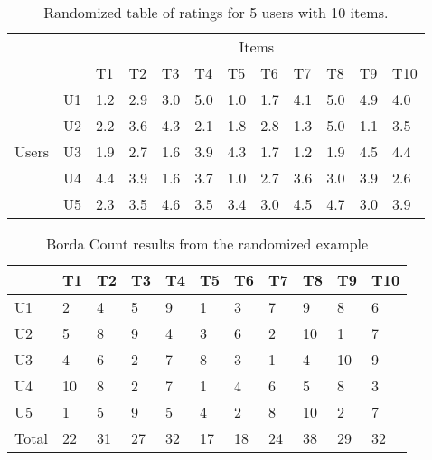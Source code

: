\begin{table}[H]
	\centering
	\begin{tabular}{cl|l|l|l|l|l|l|l|l|l|l|}
		\cline{3-12}
		\multicolumn{1}{l}{}                         &    & \multicolumn{10}{c|}{Items}                               \\ \cline{3-12} 
		\multicolumn{1}{l}{}                         &    & T1  & T2  & T3  & T4  & T5  & T6  & T7  & T8  & T9  & T10 \\ \hline
		\multicolumn{1}{|c|}{\multirow{5}{*}{Users}} & U1 & 1.2 & 2.9 & 3.0 & 5.0 & 1.0 & 1.7 & 4.1 & 5.0 & 4.9 & 4.0 \\ \cline{2-12} 
		\multicolumn{1}{|c|}{}                       & U2 & 2.2 & 3.6 & 4.3 & 2.1 & 1.8 & 2.8 & 1.3 & 5.0 & 1.1 & 3.5 \\ \cline{2-12} 
		\multicolumn{1}{|c|}{}                       & U3 & 1.9 & 2.7 & 1.6 & 3.9 & 4.3 & 1.7 & 1.2 & 1.9 & 4.5 & 4.4 \\ \cline{2-12} 
		\multicolumn{1}{|c|}{}                       & U4 & 4.4 & 3.9 & 1.6 & 3.7 & 1.0 & 2.7 & 3.6 & 3.0 & 3.9 & 2.6 \\ \cline{2-12} 
		\multicolumn{1}{|c|}{}                       & U5 & 2.3 & 3.5 & 4.6 & 3.5 & 3.4 & 3.0 & 4.5 & 4.7 & 3.0 & 3.9 \\ \hline
	\end{tabular}
	\caption{Randomized table of ratings for 5 users with 10 items.}
	\label{tbl:randomratingstable}
\end{table}


\begin{table}[H]
	\centering
	\begin{tabular}{l|l|l|l|l|l|l|l|l|l|l|}
		\cline{2-11}
		& T1 & T2 & T3 & T4 & T5 & T6 & T7 & T8 & T9 & T10 \\ \hline
		\multicolumn{1}{|l|}{U1} & 2 & 4 & 5 & 9 & 1 & 3 & 7 & 9 & 8 & 6 \\ \hline
		\multicolumn{1}{|l|}{U2} & 5 & 8 & 9 & 4 & 3 & 6 & 2 & 10 & 1 & 7 \\ \hline
		\multicolumn{1}{|l|}{U3} & 4 & 6 & 2 & 7 & 8 & 3 & 1 & 4 & 10 & 9 \\ \hline
		\multicolumn{1}{|l|}{U4} & 10 & 8 & 2 & 7 & 1 & 4 & 6 & 5 & 8 & 3 \\ \hline
		\multicolumn{1}{|l|}{U5} & 1 & 5 & 9 & 5 & 4 & 2 & 8 & 10 & 2 & 7 \\ \hline
		\multicolumn{1}{|l|}{Total} & 22 & 31 & 27 & 32 & 17 & 18 & 24 & 38 & 29 & 32 \\ \hline
	\end{tabular}
	\caption{Borda Count results from the randomized example}
	\label{tbl:bordacount}
\end{table}

